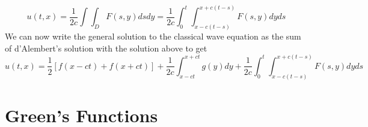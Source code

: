 \documentclass{article}
\numberwithin{equation}{section}
\begin{document}
\begin{equation*}
    u(t,x) = \frac{1}{2c}\int \! \! \!  \int_DF(s,y)dsdy=\frac{1}{2c}\int^t_0\int^{x+c(t-s)}_{x-c(t-s)}F(s,y)dyds
\end{equation*}
We can now write the general solution to the classical wave equation as the sum of d'Alembert's solution with the solution above to get 
\begin{equation}
    u(t,x)=\frac{1}{2}[f(x-ct)+f(x+ct)] +\frac{1}{2c}\int^{x+ct}_{x-ct}g(y)dy + \frac{1}{2c}\int^t_0\int^{x+c(t-s)}_{x-c(t-s)}F(s,y)dyds
\end{equation}






\newpage

\section{Green's Functions}
\end{document}
